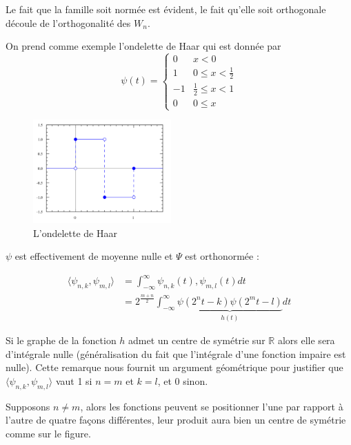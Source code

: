 	Le fait que la famille soit normée est évident, le fait qu'elle soit orthogonale découle de l'orthogonalité des $W_n$.
	
	\begin{myexmpl}
		On prend comme exemple l'ondelette de Haar qui est donnée par $$\psi(t) = \left\{
		\begin{array}{cl}
			0 & x < 0 \\
			1 & 0 \leqslant x < \frac{1}{2} \\
			-1 & \frac{1}{2} \leqslant x < 1 \\
			0 & 0 \leqslant x
		\end{array}
		\right.$$
	\end{myexmpl}
	
	\begin{figure}[h]
		\label{Haar}
		\centering
		\includegraphics[width=150pt]{Pierre/Haar.png}
		\caption{L'ondelette de Haar}
	\end{figure}
	
	$\psi$ est effectivement de moyenne nulle et $\Psi$ est orthonormée :
	
	\begin{align*}
		\langle \psi_{n, k}, \psi_{m, l}\rangle &= \int_{-\infty}^{\infty} \psi_{n, k}(t), \psi_{m, l}(t) dt \\
		&= 2^{\frac{m+n}{2}} \int_{-\infty}^{\infty} \underbrace{\psi(2^nt - k) \psi(2^mt - l)}_{h(t)} dt
	\end{align*}
	
	Si le graphe de la fonction $h$ admet un centre de symétrie sur $\mathbb{R}$ alors elle sera d'intégrale nulle (généralisation du fait que l'intégrale d'une fonction impaire est nulle). Cette remarque nous fournit un argument géométrique pour justifier que $\langle \psi_{n, k}, \psi_{m, l}\rangle$ vaut 1 si $n = m$ et $k = l$, et 0 sinon.
	
	Supposons $n \neq m$, alors les fonctions peuvent se positionner l'une par rapport à l'autre de quatre façons différentes, leur produit aura bien un centre de symétrie comme sur le figure.
		
